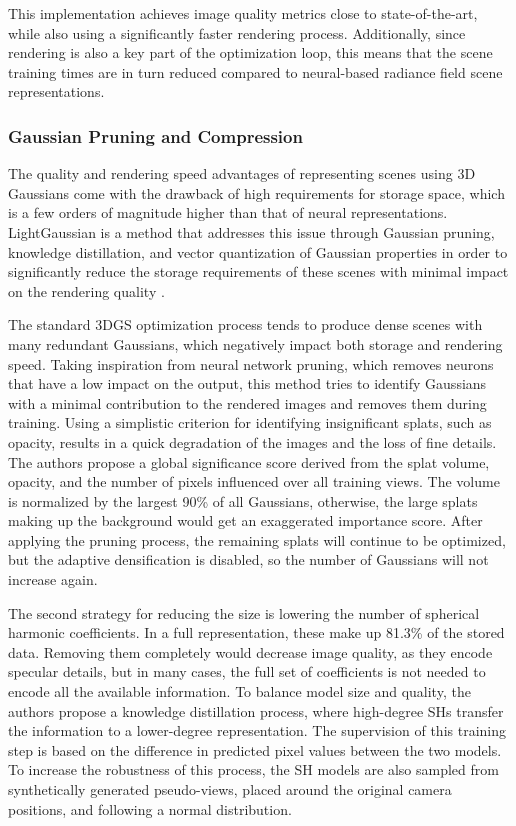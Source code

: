 This implementation achieves image quality metrics close to state-of-the-art, while also using a significantly faster rendering process. Additionally, since rendering is also a key part of the optimization loop, this means that the scene training times are in turn reduced compared to neural-based radiance field scene representations. 

\subsubsection{Gaussian Pruning and Compression}
The quality and rendering speed advantages of representing scenes using 3D Gaussians come with the drawback of high requirements for storage space, which is a few orders of magnitude higher than that of neural representations. LightGaussian is a method that addresses this issue through Gaussian pruning, knowledge distillation, and vector quantization of Gaussian properties in order to significantly reduce the storage requirements of these scenes with minimal impact on the rendering quality \cite{fan2023lightgaussian}. 

The standard 3DGS optimization process tends to produce dense scenes with many redundant Gaussians, which negatively impact both storage and rendering speed. Taking inspiration from neural network pruning, which removes neurons that have a low impact on the output, this method tries to identify Gaussians with a minimal contribution to the rendered images and removes them during training. Using a simplistic criterion for identifying insignificant splats, such as opacity, results in a quick degradation of the images and the loss of fine details. The authors propose a global significance score derived from the splat volume, opacity, and the number of pixels influenced over all training views. The volume is normalized by the largest 90\% of all Gaussians, otherwise, the large splats making up the background would get an exaggerated importance score. After applying the pruning process, the remaining splats will continue to be optimized, but the adaptive densification is disabled, so the number of Gaussians will not increase again.

The second strategy for reducing the size is lowering the number of spherical harmonic coefficients. In a full representation, these make up 81.3\% of the stored data. Removing them completely would decrease image quality, as they encode specular details, but in many cases, the full set of coefficients is not needed to encode all the available information. To balance model size and quality, the authors propose a knowledge distillation process, where high-degree SHs transfer the information to a lower-degree representation. The supervision of this training step is based on the difference in predicted pixel values between the two models. To increase the robustness of this process, the SH models are also sampled from synthetically generated pseudo-views, placed around the original camera positions, and following a normal distribution.

